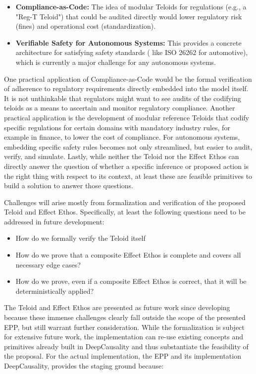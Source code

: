 \begin{itemize}
    \item \textbf{Compliance-as-Code:} The idea of modular Teloids for regulations (e.g., a "Reg-T Teloid") that could be audited
    directly would lower regulatory risk (fines) and operational cost (standardization).
    \item \textbf{Verifiable Safety for Autonomous Systems:} This provides a concrete architecture for satisfying safety standards (
    like ISO 26262 for automotive), which is currently a major challenge for any autonomous systems.
\end{itemize}


One practical application of Compliance-as-Code would be the formal verification of adherence to regulatory requirements
directly embedded into the model itself. It is not unthinkable that regulators might want to see audits of the codifying
teloids as a means to ascertain and monitor regulatory compliance. Another practical application is the development of
modular reference Teloids that codify specific regulations for certain domains with mandatory industry rules,
for example in finance, to lower the cost of compliance. For autonomous systems, embedding specific safety rules
becomes not only streamlined, but easier to audit, verify, and simulate. Lastly, while neither the Teloid nor the Effect
Ethos can directly answer the question of whether a specific inference or proposed action is the right thing
with respect to its context, at least these are feasible primitives to build a solution to answer those questions.

Challenges will arise mostly from formalization and verification of the proposed Teloid and Effect Ethos. Specifically,
at least the following questions need to be addressed in future development:

\begin{itemize}
    \item How do we formally verify the Teloid itself
    \item How do we prove that a composite Effect Ethos is complete and covers all necessary edge cases?
    \item How do we prove, even if a composite Effect Ethos is correct, that it will be deterministically applied?
\end{itemize}

The Teloid and Effect Ethos are presented as future work since developing because these immense challenges clearly
fall outside the scope of the presented EPP, but still warrant further consideration.
While the formalization is
subject for extensive future work, the implementation can re-use existing concepts and primitives already built in
DeepCausality and thus substantiate the feasibility of the proposal. For the actual implementation, the EPP and its
implementation DeepCausality, provides the staging ground because:

